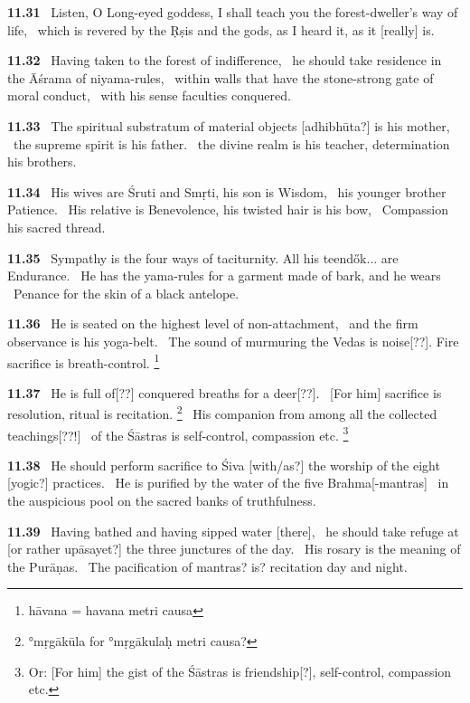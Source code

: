 \documentclass{article}
\begin{document}
\textbf{11.31}%
\ Listen, O Long-eyed goddess, I shall teach you the forest-dweller's way of life,%
\ which is revered by the Ṛṣis and the gods, as I heard it, as it [really] is.%


\textbf{11.32}%
\ Having taken to the forest of indifference,%
\                         he should take residence in the Āśrama of niyama-rules,%
\ within walls that have the stone-strong gate of moral conduct,%
\                  with his sense faculties conquered.%


\textbf{11.33}%
\ The spiritual substratum of material objects [adhibhūta?] is his mother,%
\                      the supreme spirit is his father.%
\ the divine realm is his teacher, determination his brothers.%


\textbf{11.34}%
\ His wives are Śruti and Smṛti, his son is Wisdom,%
\              his younger brother Patience.%
\ His relative is Benevolence, his twisted hair is his bow,%
\                                  Compassion his sacred thread.%


\textbf{11.35}%
\ Sympathy is the four ways of taciturnity. All his teendők... are Endurance.%
\ He has the yama-rules for a garment made of bark, and he wears%
\               Penance for the skin of a black antelope.%


\textbf{11.36}%
\ He is seated on the highest level of non-attachment,%
\               and the firm observance is his yoga-belt.%
\ The sound of murmuring the Vedas is noise[??]. Fire sacrifice is breath-control.%
\footnote{hāvana = havana metri causa }%


\textbf{11.37}%
\ He is full of[??] conquered breaths for a deer[??].%
\              [For him] sacrifice is resolution, ritual is recitation.%
\footnote{°mṛgākūla for °mṛgākulaḥ metri causa? }%
\ His companion from among all the collected teachings[??!]%
\              of the Śāstras is self-control, compassion etc.%
\footnote{Or: [For him] the gist of the Śāstras is friendship[?], self-control, compassion etc. }%


\textbf{11.38}%
\ He should perform sacrifice to Śiva [with/as?] the worship of the eight [yogic?] practices.%
\ He is purified by the water of the five Brahma[-mantras]%
\              in the auspicious pool on the sacred banks of truthfulness.%


\textbf{11.39}%
\ Having bathed and having sipped water [there],%
\              he should take refuge at [or rather upāsayet?] the three junctures of the day.%
\ His rosary is the meaning of the Purāṇas.%
\              The pacification of mantras? is? recitation day and night.%
\end{document}
